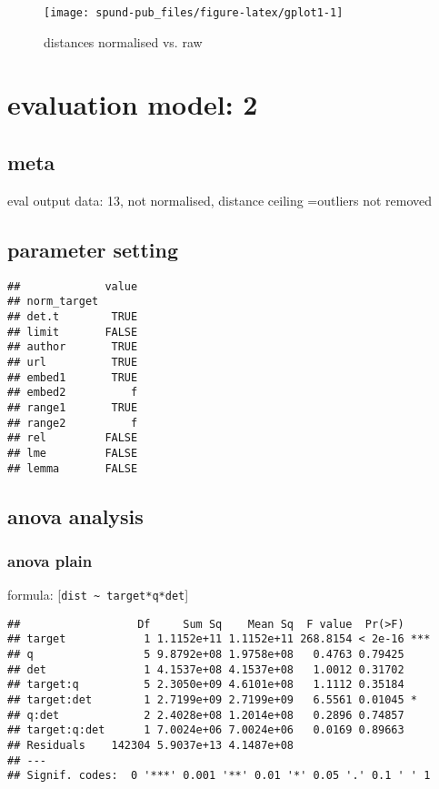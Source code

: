 \documentclass[
  12pt,
  oneside]{book}
\begin{document}
\begin{figure}[H]
\texttt{[image: spund-pub\_files/figure-latex/gplot1-1]} \caption{distances normalised vs. raw}\label{fig:gplot1}
\end{figure}

\section{evaluation model: 2}\label{evaluation-model-2}

\subsection{meta}\label{meta-1}

eval output data: 13, not normalised, distance ceiling =outliers not removed

\subsection{parameter setting}\label{parameter-setting-1}

\begin{verbatim}
##             value
## norm_target      
## det.t        TRUE
## limit       FALSE
## author       TRUE
## url          TRUE
## embed1       TRUE
## embed2          f
## range1       TRUE
## range2          f
## rel         FALSE
## lme         FALSE
## lemma       FALSE
\end{verbatim}

\subsection{anova analysis}\label{anova-analysis-1}

\subsubsection{anova plain}\label{anova-plain-1}

formula: {[}\texttt{dist\ \textasciitilde{}\ target*q*det}{]}

\begin{verbatim}
##                  Df     Sum Sq    Mean Sq  F value  Pr(>F)    
## target            1 1.1152e+11 1.1152e+11 268.8154 < 2e-16 ***
## q                 5 9.8792e+08 1.9758e+08   0.4763 0.79425    
## det               1 4.1537e+08 4.1537e+08   1.0012 0.31702    
## target:q          5 2.3050e+09 4.6101e+08   1.1112 0.35184    
## target:det        1 2.7199e+09 2.7199e+09   6.5561 0.01045 *  
## q:det             2 2.4028e+08 1.2014e+08   0.2896 0.74857    
## target:q:det      1 7.0024e+06 7.0024e+06   0.0169 0.89663    
## Residuals    142304 5.9037e+13 4.1487e+08                     
## ---
## Signif. codes:  0 '***' 0.001 '**' 0.01 '*' 0.05 '.' 0.1 ' ' 1
\end{verbatim}
\end{document}
